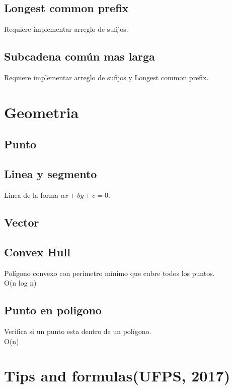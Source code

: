 \documentclass[10pt,landscape,twocolumn,a4paper,notitlepage]{article}
\newcommand\cppfile[2][]{

}
\begin{document}
			\subsection{Longest common prefix}
			Requiere implementar arreglo de sufijos.
			\cppfile[50-65]{cadenas/Arreglo_de_sufijos.cpp}
			\subsection{Subcadena común mas larga}
			Requiere implementar arreglo de sufijos y Longest common prefix.
			\cppfile[67-89]{cadenas/Arreglo_de_sufijos.cpp}
			
		\section{Geometria}
			\subsection{Punto}
			\cppfile[22-59]{geometria/punto.cpp}
			\subsection{Linea y segmento}
			Linea de la forma $ax + by + c = 0$.
			\cppfile[42-105]{geometria/linea.cpp}
			\subsection{Vector}
			\cppfile[39-67]{geometria/vector.cpp}
			\subsection{Convex Hull}
			Polígono convexo con perímetro mínimo que cubre todos los puntos.\\
			O(n log n)
			\cppfile[48-79]{geometria/convex_hull.cpp}
			\subsection{Punto en poligono}
			Verifica si un punto esta dentro de un polígono.\\
			O(n)
			\cppfile[67-76]{geometria/poligono.cpp}
			
	
	\section{Tips and formulas(UFPS, 2017)}
\end{document}
